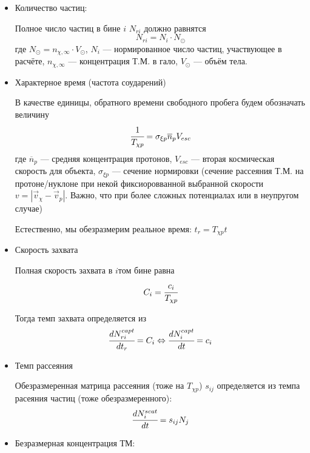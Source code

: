 	
	\begin{itemize}
		\item Количество частиц:
		
		Полное число частиц в бине $i$ $N_{ri}$ должно равнятся
		\begin{equation*}
			N_{ri} = N_i \cdot N_{\odot}
		\end{equation*}
		где $N_{\odot} = n_{\chi,\infty}\cdot V_{\odot}$,  $N_i$ --- нормированное число частиц, участвующее в расчёте, $n_{\chi,\infty}$ --- концентрация Т.М. в гало, $V_{\odot}$ --- объём тела.
		\item Характерное время (частота соударений)
		
		В качестве единицы, обратного времени свободного пробега будем обозначать величину
		\begin{equation*}
			\cfrac{1}{T_{\chi p}} = 
			\sigma_{\xi p} \overline{n}_p V_{esc}
		\end{equation*}
		где $\overline{n}_p$ --- средняя концентрация протонов, $V_{esc}$ --- вторая космическая скорость для объекта, $\sigma_{\xi p}$ --- сечение нормировки (сечение рассеяния Т.М. на протоне/нуклоне при некой фиксиоровванной выбранной скорости $v = |\vec{v}_{\chi} - \vec{v}_p|$. Важно, что при более сложных потенциалах или в неупругом случае) 
		
		Естественно, мы обезразмерим реальное время: $t_r = T_{\chi p} t$
		\item Скорость захвата
		
		Полная скорость захвата в $i$том бине равна
		\begin{equation*}
			C_i = \cfrac{c_i}{T_{\chi p}}
		\end{equation*}
		
		Тогда темп захвата определяется из
		\begin{equation*}
			\cfrac{dN_{ri}^{capt}}{dt_r} = C_i \Leftrightarrow \cfrac{d N_{i}^{capt}}{dt} = c_i
		\end{equation*}
		
		\item Темп рассеяния
		
		Обезразмеренная матрица рассеяния (тоже на $T_{\chi p}$) $s_{ij}$ определяется из 
		темпа расеяния частиц (тоже обезразмеренного):
		\begin{equation*}
		\cfrac{d N_{i}^{scat}}{dt} = s_{ij} N_j
		\end{equation*}
		
		\item Безразмерная концентрация ТМ:
		

\end{itemize}

